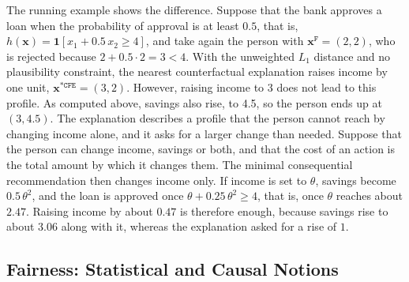 The running example shows the difference. Suppose that the bank approves a loan when the
probability of approval is at least $0.5$, that is, $h(\mathbf{x}) = \mathbf{1}[x_1 + 0.5\,x_2
\geq 4]$, and take again the person with $\mathbf{x}^{\mathtt{F}} = (2, 2)$, who is rejected
because $2 + 0.5 \cdot 2 = 3 < 4$. With the unweighted $L_1$ distance and no plausibility
constraint, the nearest counterfactual explanation raises income by one unit,
$\mathbf{x}^{*\mathtt{CFE}} = (3, 2)$. However, raising income to 3 does not lead to this profile.
As computed above, savings also rise, to 4.5, so the person ends up at $(3, 4.5)$. The explanation
describes a profile that the person cannot reach by changing income alone, and it asks for a larger
change than needed. Suppose that the person can change income, savings or both, and that the cost
of an action is the total amount by which it changes them. The minimal consequential recommendation
then changes income only. If income is set to $\theta$, savings become $0.5\,\theta^2$, and the
loan is approved once $\theta + 0.25\,\theta^2 \geq 4$, that is, once $\theta$ reaches about
$2.47$. Raising income by about $0.47$ is therefore enough, because savings rise to about $3.06$
along with it, whereas the explanation asked for a rise of $1$.



\subsection{Fairness: Statistical and Causal Notions}
\label{sec:bg-fairness}

